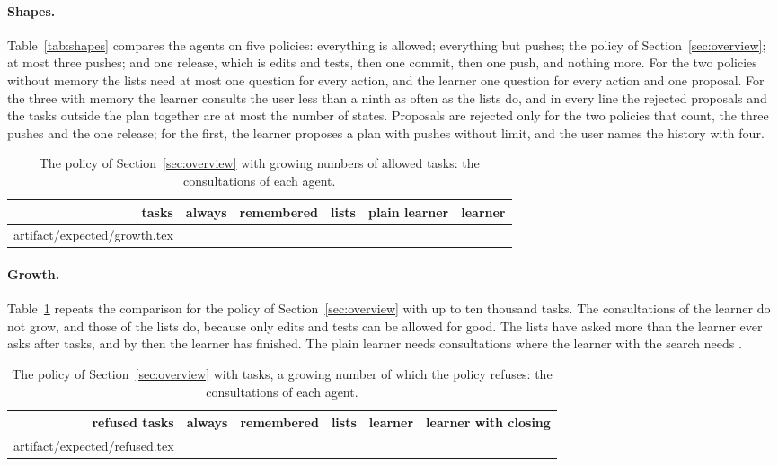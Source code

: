 \documentclass[acmsmall,nonacm,screen]{acmart}
\makeatletter
\newcommand{\claim}[2]{#2}
\newcommand{\rows}[1]{\@@input artifact/expected/#1.tex }
\makeatother
\begin{document}
\paragraph{Shapes.} Table~\ref{tab:shapes} compares the agents on five policies: everything
is allowed; everything but pushes; the policy of Section~\ref{sec:overview}; at most three
pushes; and one release, which is edits and tests, then one commit, then one push, and
nothing more. \claim{shapes}{For the two policies without memory the lists need at most
one question for every action, and the learner one question for every action and one
proposal. For the three with memory the learner consults the user less than a ninth as often
as the lists do, and in every line the rejected proposals and the tasks outside the plan
together are at most the number of states. Proposals are rejected only for the two policies
that count, the three pushes and the one release; for the first, the learner proposes a plan
with pushes without limit, and the user names the history with four.}

\begin{table}
\caption{The policy of Section~\ref{sec:overview} with growing numbers of allowed tasks: the
consultations of each agent.}
\label{tab:growth}
\small
\begin{tabular}{rrrrrr}
\toprule
tasks & always & remembered & lists & plain learner & learner \\
\midrule
\rows{growth}
\bottomrule
\end{tabular}
\end{table}

\paragraph{Growth.} \claim{growth}{Table~\ref{tab:growth} repeats the comparison for the
policy of Section~\ref{sec:overview} with up to ten thousand tasks. The consultations of the
learner do not grow, and those of the lists do, because only edits and tests can be allowed
for good. The lists have asked more than the learner ever asks after \exEven{} tasks, and by
then the learner has finished.} The plain learner needs \exGrowthPlain{} consultations where
the learner with the search needs \exGrowthLearner{}.

\begin{table}
\caption{The policy of Section~\ref{sec:overview} with \exRefusedTasks{} tasks, a growing
number of which the policy refuses: the consultations of each agent.}
\label{tab:refused}
\small
\begin{tabular}{rrrrrr}
\toprule
refused tasks & always & remembered & lists & learner & learner with closing \\
\midrule
\rows{refused}
\bottomrule
\end{tabular}
\end{table}
\end{document}
